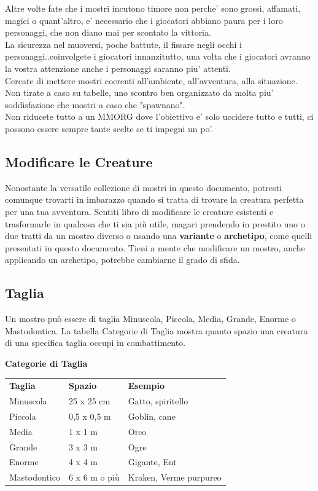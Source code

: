 \begin{multicols}{2}
Altre volte fate che i mostri incutono timore non perche' sono grossi, affamati, magici o quant'altro, e' necessario che i giocatori abbiano paura per i loro personaggi, che non diano mai per scontato la vittoria.\\
La sicurezza nel muoversi, poche battute, il fissare negli occhi i personaggi..coinvolgete i giocatori innanzitutto, una volta che i giocatori avranno la vostra attenzione anche i personaggi saranno piu' attenti.\\

Cercate di mettere mostri coerenti all'ambiente, all'avventura, alla situazione. Non tirate a caso su tabelle, uno scontro ben organizzato da molta piu' soddisfazione che mostri a caso che "spawnano".\\

Non riducete tutto a un MMORG dove l'obiettivo e' solo uccidere tutto e tutti, ci possono essere sempre tante scelte se ti impegni un po'.

\subsection{Modificare le Creature}

Nonostante la versatile collezione di mostri in questo documento, potresti comunque trovarti in imbarazzo quando si tratta di trovare la creatura perfetta per una tua avventura. Sentiti libro di modificare le creature esistenti e trasformarle in qualcosa che ti sia più utile, magari prendendo in prestito uno o due tratti da un mostro diverso o usando una \textbf{variante} o \textbf{archetipo}, come quelli presentati in questo documento. Tieni a mente che modificare un mostro, anche applicando un archetipo, potrebbe cambiarne il grado di sfida. 

\subsection{Taglia}

Un mostro può essere di taglia Minuscola, Piccola, Media, Grande, Enorme o Mastodontica. La tabella Categorie di Taglia mostra quanto spazio una creatura di una specifica taglia occupi in combattimento.

\medskip

\textbf{Categorie di Taglia}

\begin{tabular}{lll}
\toprule
\textbf{Taglia}& \textbf{Spazio} & \textbf{Esempio}\\
Minuscola & 25 x 25 cm& Gatto, spiritello\\
Piccola & 0,5 x 0,5 m & Goblin, cane\\
Media & 1 x 1 m & Orco\\
Grande & 3 x 3 m& Ogre\\
Enorme & 4 x 4 m & Gigante, Ent\\
Mastodontico & 6 x 6 m o più&Kraken, Verme purpureo\\
\end{tabular}


\end{multicols}
